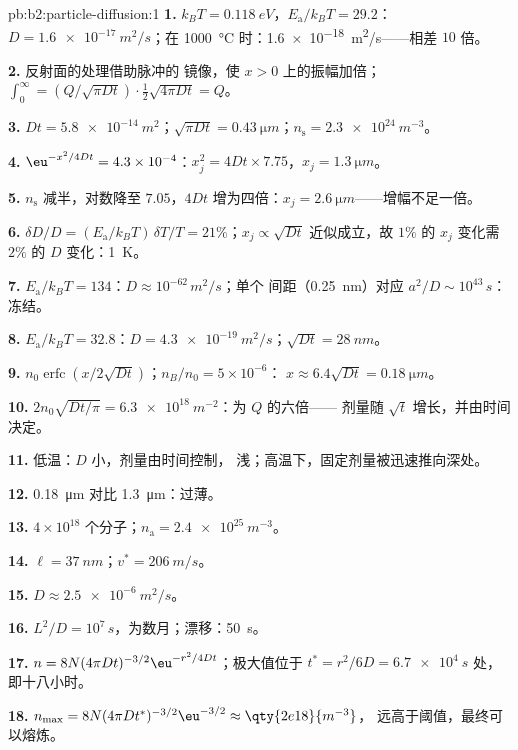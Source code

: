 \begin{solution}{pb:b2:particle-diffusion:1}
\textbf{1.} $k_BT = \qty{0.118}{eV}$，$E_{\text{a}}/k_BT = 29.2$：$D =
\qty{1.6e-17}{m^2/s}$；在 \qty{1000}{\celsius} 时：\qty{1.6e-18}{m^2/s}——相差
$10$ 倍。

\textbf{2.} 反射面的处理借助脉冲的
镜像，使 $x > 0$ 上的振幅加倍；$\int_0^\infty = (Q/\sqrt{\pi Dt})
\cdot \tfrac12\sqrt{4\pi Dt} = Q$。

\textbf{3.} $Dt = \qty{5.8e-14}{m^2}$；$\sqrt{\pi Dt} = \qty{0.43}{\micro m}$；$n_{\text{s}}
= \qty{2.3e24}{m^{-3}}$。

\textbf{4.} $\eu^{-x^2/4Dt} = 4.3 \times 10^{-4}$：$x_j^2 = 4Dt \times 7.75$，$x_j =
\qty{1.3}{\micro m}$。

\textbf{5.} $n_{\text{s}}$ 减半，对数降至 $7.05$，$4Dt$
增为四倍：$x_j = \qty{2.6}{\micro m}$——增幅不足一倍。

\textbf{6.} $\delta D/D = (E_{\text{a}}/k_BT)\,\delta T/T = 21\%$；$x_j \propto
\sqrt{Dt}$ 近似成立，故 $1\%$ 的 $x_j$ 变化需 $2\%$ 的 $D$ 变化：\qty{1}{K}。

\textbf{7.} $E_{\text{a}}/k_BT = 134$：$D \approx 10^{-62}\,\unit{m^2/s}$；单个
间距（\qty{0.25}{nm}）对应 $a^2/D \sim 10^{43}\,\unit{s}$：冻结。

\textbf{8.} $E_{\text{a}}/k_BT = 32.8$：$D = \qty{4.3e-19}{m^2/s}$；$\sqrt{Dt} =
\qty{28}{nm}$。

\textbf{9.} $n_0\operatorname{erfc}(x/2\sqrt{Dt})$；$n_B/n_0 = 5 \times 10^{-6}$：
$x \approx 6.4\sqrt{Dt} = \qty{0.18}{\micro m}$。

\textbf{10.} $2n_0\sqrt{Dt/\pi} = \qty{6.3e18}{m^{-2}}$：为 $Q$ 的六倍——
剂量随 $\sqrt t$ 增长，并由时间决定。

\textbf{11.} 低温：$D$ 小，剂量由时间控制，
浅；高温下，固定剂量被迅速推向深处。

\textbf{12.} \qty{0.18}{\micro m} 对比 \qty{1.3}{\micro m}：过薄。

\textbf{13.} $4 \times 10^{18}$ 个分子；$n_{\text{a}} = \qty{2.4e25}{m^{-3}}$。

\textbf{14.} $\ell = \qty{37}{nm}$；$v^* = \qty{206}{m/s}$。

\textbf{15.} $D \approx \qty{2.5e-6}{m^2/s}$。

\textbf{16.} $L^2/D = 10^7\,\unit{s}$，为数月；漂移：\qty{50}{s}。

\textbf{17.} $n = 8N(4\pi Dt)^{-3/2}\eu^{-r^2/4Dt}$；极大值位于 $t^* = r^2/6D =
\qty{6.7e4}{s}$ 处，即十八小时。

\textbf{18.} $n_{\max} = 8N(4\pi Dt^*)^{-3/2}\eu^{-3/2} \approx \qty{2e18}{m^{-3}}$，
远高于阈值，最终可以熔炼。


\end{solution}
